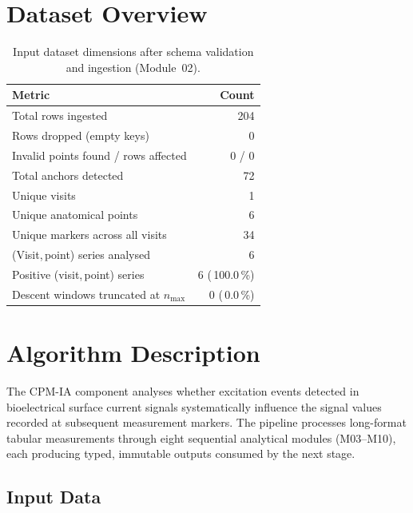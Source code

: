 \documentclass[a4paper,11pt]{article}
\begin{document}
\section{Dataset Overview}

\begin{table}[h!]
\centering
\small
\caption{Input dataset dimensions after schema validation and ingestion (Module~02).}
\begin{tabular}{lr}
\toprule
\textbf{Metric} & \textbf{Count} \\
\midrule
Total rows ingested                        & 204 \\
Rows dropped (empty keys)                  & 0 \\
Invalid points found / rows affected       & 0 / 0 \\
Total anchors detected                     & 72 \\
Unique visits                          & 1 \\
Unique anatomical points               & 6 \\
Unique markers across all visits       & 34 \\
(Visit,\,point) series analysed        & 6 \\
Positive (visit,\,point) series        & 6 (\,100.0\,\%) \\
Descent windows truncated at $n_{\max}$ & 0 (\,0.0\,\%) \\
\bottomrule
\end{tabular}
\end{table}

\section{Algorithm Description}

The CPM-IA component analyses whether excitation events detected in bioelectrical surface
current signals systematically influence the signal values recorded at subsequent measurement
markers. The pipeline processes long-format tabular measurements through eight sequential
analytical modules (M03--M10), each producing typed, immutable outputs consumed by the next
stage.

\subsection{Input Data}
\end{document}
